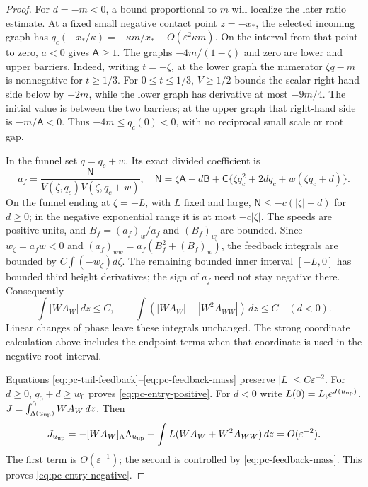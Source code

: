 \begin{proof}
For $d=-m<0$, a bound proportional to $m$ will localize the later ratio
estimate. At a fixed small negative contact point $z=-x_*$, the selected
incoming graph has
$q_c(-x_*/\kappa)=-\kappa m/x_*+O(\varepsilon^2\kappa m)$.
On the interval from that point to zero, $a<0$ gives $\mathsf A\ge1$.
The graphs $-4m/(1-\zeta)$ and zero are lower and upper barriers.
Indeed, writing $t=-\zeta$, at the lower graph the numerator
$\zeta q-m$ is nonnegative for $t\ge1/3$. For $0\le t\le1/3$,
$V\ge1/2$ bounds the scalar right-hand side below by $-2m$, while the
lower graph has derivative at most $-9m/4$. The initial value is between
the two barriers;
at the upper graph that right-hand side is $-m/\mathsf A<0$. Thus
$-4m\le q_c(0)<0$, with no reciprocal small scale or root gap.

In the funnel set $q=q_c+w$. Its exact divided coefficient is
\[
 a_f=\frac{\mathsf N}{V(\zeta,q_c)V(\zeta,q_c+w)},\quad
 \mathsf N=\zeta\mathsf A-d\mathsf B+
 \mathsf C\{\zeta q_c^2+2dq_c+w(\zeta q_c+d)\}.
\]
On the funnel ending at $\zeta=-L$, with $L$ fixed and large,
$\mathsf N\le-c(|\zeta|+d)$ for $d\ge0$; in the negative
exponential range it is at most $-c|\zeta|$. The speeds are positive
units, and $B_f=(a_f)_w/a_f$ and $(B_f)_w$ are bounded. Since
$w_\zeta=a_fw<0$ and $(a_f)_{ww}=a_f(B_f^2+(B_f)_w)$, the feedback
integrals are bounded by $C\int(-w_\zeta)d\zeta$. The remaining
bounded inner interval $[-L,0]$ has bounded third height derivatives;
the sign of $a_f$ need not stay negative there.
Consequently
\begin{equation}
\label{eq:pc-feedback-mass}
 \int|WA_W|\,dz\le C,\qquad
 \int(|WA_W|+|W^2A_{WW}|)\,dz\le C\quad(d<0).
\end{equation}
Linear changes of phase leave these integrals unchanged. The strong
coordinate calculation above includes the endpoint terms when that
coordinate is used in the negative root interval.

Equations \eqref{eq:pc-tail-feedback}--\eqref{eq:pc-feedback-mass}
preserve $|L|\le C\varepsilon^{-2}$. For $d\ge0$,
$q_0+d\ge w_0$ proves \eqref{eq:pc-entry-positive}. For $d<0$ write
$L(0)=L_i e^{J(u_{\rm up})}$,
$J=\int_{\Lambda(u_{\rm up})}^0WA_W\,dz$. Then
\[
 J_{u_{\rm up}}=-[WA_W]_{\Lambda}\Lambda_{u_{\rm up}}+
              \int L(WA_W+W^2A_{WW})\,dz=O(\varepsilon^{-2}).
\]
The first term is $O(\varepsilon^{-1})$; the second is controlled by
\eqref{eq:pc-feedback-mass}. This proves
\eqref{eq:pc-entry-negative}.


\end{proof}
